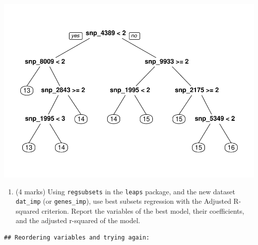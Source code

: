 \documentclass[
]{article}
\newenvironment{Shaded}{\begin{snugshade}}{\end{snugshade}}
\newcommand{\AttributeTok}[1]{\textcolor[rgb]{0.13,0.29,0.53}{#1}}
\newcommand{\ConstantTok}[1]{\textcolor[rgb]{0.56,0.35,0.01}{#1}}
\newcommand{\DecValTok}[1]{\textcolor[rgb]{0.00,0.00,0.81}{#1}}
\newcommand{\FunctionTok}[1]{\textcolor[rgb]{0.13,0.29,0.53}{\textbf{#1}}}
\newcommand{\NormalTok}[1]{#1}
\newcommand{\OtherTok}[1]{\textcolor[rgb]{0.56,0.35,0.01}{#1}}
\newcommand{\SpecialCharTok}[1]{\textcolor[rgb]{0.81,0.36,0.00}{\textbf{#1}}}
\providecommand{\tightlist}{%
  \setlength{\itemsep}{0pt}\setlength{\parskip}{0pt}}
\begin{document}
\includegraphics{STAT847_A2_Cbverghe_files/figure-latex/unnamed-chunk-5-1.pdf}
\newpage

\begin{enumerate}
\def\labelenumi{\arabic{enumi}.}
\setcounter{enumi}{4}
\tightlist
\item
  (4 marks) Using \texttt{regsubsets} in the \texttt{leaps} package, and
  the new dataset \texttt{dat\_imp} (or \texttt{genes\_imp}), use best
  subsets regression with the Adjusted R-squared criterion. Report the
  variables of the best model, their coefficients, and the adjusted
  r-squared of the model.
\end{enumerate}

\begin{Shaded}
\end{Shaded}

\begin{verbatim}
## Reordering variables and trying again:
\end{verbatim}
\end{document}
